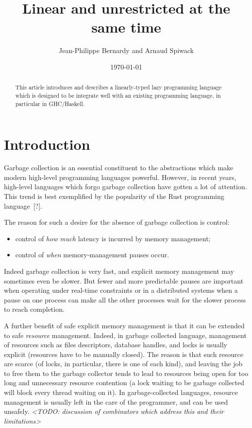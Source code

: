 \documentclass[11pt]{article}
\author{Jean-Philippe Bernardy and Arnaud Spiwack}
\date{\today}
\title{Linear and unrestricted at the same time}
\newcommand{\citationneeded}{[?]}
\newcommand{\TODO}[1]{{\footnotesize\it <TODO: #1>}}
\begin{document}
\maketitle
\begin{abstract}
  This article introduces and describes a
  linearly-typed lazy programming language which is designed to be
  integrate well with an existing programming language, in particular
  in GHC/Haskell.
\end{abstract}

\setcounter{tocdepth}{3}
\tableofcontents

\section{Introduction}


Garbage collection is an
essential constituent to the abstractions which make modern high-level
programming languages powerful. However, in recent years, high-level
languages which forgo garbage collection have gotten a lot of
attention. This trend is best exemplified by the popularity of the
Rust programming language~\citationneeded.

The reason for such a desire for the absence of garbage collection is
control:
\begin{itemize}
\item control of \emph{how much} latency is incurred by memory management;
\item control of \emph{when} memory-management pauses occur.
\end{itemize}
Indeed garbage collection is very fast, and explicit memory management
may sometimes even be slower. But fewer and more predictable pauses are
important when operating under real-time constraints or in a
distributed systems when a pause on one process can make all the other
processes wait for the slower process to reach completion.

A further benefit of safe explicit memory management is that it can be
extended to safe \emph{resource} management. Indeed, in garbage
collected language, management of resources such as files descriptors,
database handles, and locks is usually explicit (resources have to be
manually closed). The reason is that such resource are scarce (of
locks, in particular, there is one of each kind), and leaving the job
to free them to the garbage collector tends to lead to resources being
open for too long and unnecessary resource contention (a lock waiting
to be garbage collected will block every thread waiting on it). In
garbage-collected languages, resource management is usually left in
the care of the programmer, and can be used unsafely. \TODO{discussion
  of combinators which address this and their limitations}
\end{document}
